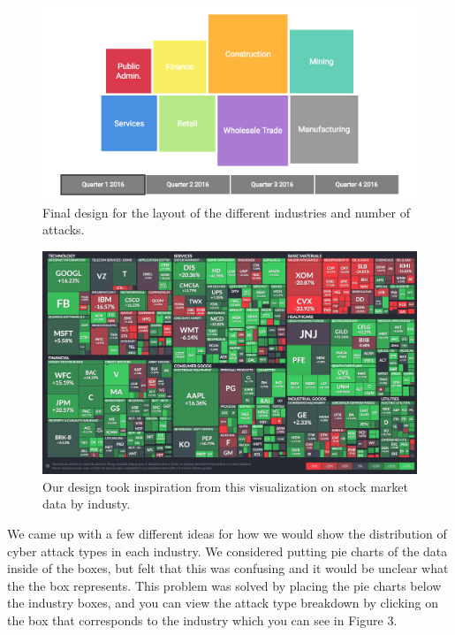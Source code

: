 \documentclass[journal]{vgtc}                %
\begin{document}
\begin{figure}[tb]
  \centering %
  \includegraphics[width=\columnwidth]{final_design1}
  \caption{Final design for the layout of the different industries and number of attacks.}
  \label{fig:sample}
\end{figure}

\begin{figure}[tb]
  \centering %
  \includegraphics[width=\columnwidth]{stock_market}
  \caption{Our design took inspiration from this visualization on stock market data by industy.}
  \label{fig:sample}
\end{figure}

We came up with a few different ideas for how we would show the distribution of cyber attack types in each industry.
We considered putting pie charts of the data inside of the boxes, but felt that this was confusing and it would be unclear what the the box represents. 
This problem was solved by placing the pie charts below the industry boxes, and you can view the attack type breakdown by clicking on the box that corresponds to the industry which you can see in Figure 3.
\end{document}
